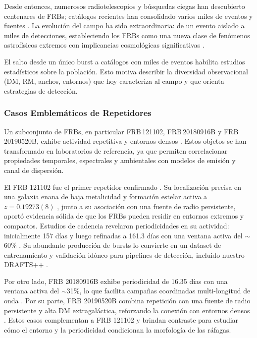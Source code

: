 Desde entonces, numerosos radiotelescopios y búsquedas ciegas han descubierto centenares de FRBs; catálogos recientes han consolidado varios miles de eventos y fuentes \citep{CHIME2021,CHIMEFRB_2021_Catalog1}. La evolución del campo ha sido extraordinaria: de un evento aislado a miles de detecciones, estableciendo los FRBs como una nueva clase de fenómenos astrofísicos extremos con implicancias cosmológicas significativas \citep{Petroff_2022}.

 El salto desde un único burst a catálogos con miles de eventos habilita estudios estadísticos sobre la población. Esto motiva describir la diversidad observacional (DM, RM, anchos, entornos) que hoy caracteriza al campo y que orienta estrategias de detección.

\subsubsection{Casos Emblemáticos de Repetidores}

Un subconjunto de FRBs, en particular FRB\,121102, FRB\,20180916B y FRB\,20190520B, exhibe actividad repetitiva y entornos densos \citep{CHIME2021,Niu2022_FRB20190520B}. Estos objetos se han transformado en laboratorios de referencia, ya que permiten correlacionar propiedades temporales, espectrales y ambientales con modelos de emisión y canal de dispersión.

El FRB 121102 fue el primer repetidor confirmado \citep{Spitler2016}. Su localización precisa en una galaxia enana de baja metalicidad y formación estelar activa a $z = 0.19273(8)$ \citep{2017Natur.541...58C,Tendulkar2017}, junto a su asociación con una fuente de radio persistente, aportó evidencia sólida de que los FRBs pueden residir en entornos extremos y compactos. Estudios de cadencia revelaron periodicidades en su actividad: inicialmente 157 días \citep{2020MNRAS.495.3551R} y luego refinadas a 161.3 días con una ventana activa del $\sim$60\% \citep{cruces2020frb121102}. Su abundante producción de bursts lo convierte en un dataset de entrenamiento y validación idóneo para pipelines de detección, incluido nuestro DRAFTS++ \citep{zhang2024drafts}.

Por otro lado, FRB 20180916B exhibe periodicidad de 16.35 días con una ventana activa del $\sim$31\%, lo que facilita campañas coordinadas multi-longitud de onda \citep{CHIME_FRB_Collaboration_2020}. Por su parte, FRB 20190520B combina repetición con una fuente de radio persistente y alta DM extragaláctica, reforzando la conexión con entornos densos \citep{Niu2022_FRB20190520B}. Estos casos complementan a FRB 121102 y brindan contraste para estudiar cómo el entorno y la periodicidad condicionan la morfología de las ráfagas.

